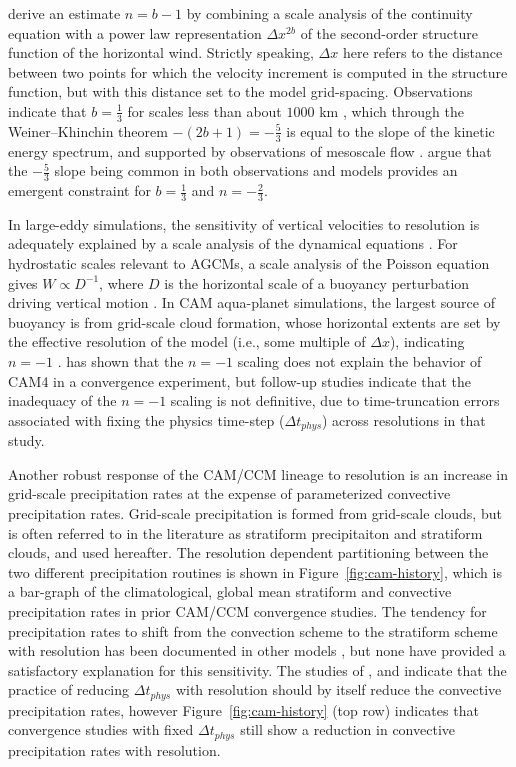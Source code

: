\documentclass[times]{qjrms4}
\begin{document}
\cite{RETAL2016CD} derive an estimate $n= b-1$ by combining a scale analysis of the continuity equation with a power law representation $\Delta x^{2b}$ of the second-order structure function of the horizontal wind. Strictly speaking, $\Delta x$ here refers to the distance between two points for which the velocity increment is computed in the structure function, but with this distance set to the model grid-spacing. Observations indicate that $b=\frac{1}{3}$ for scales less than about $1000$ km \citep{CETAL1999JGR}, which through the Weiner–Khinchin theorem $- \left( 2b+1 \right) = -\frac{5}{3}$ is equal to the slope of the kinetic energy spectrum, and supported by observations of mesoscale flow \citep{NG1985JAS}. \cite{RETAL2016CD} argue that the $-\frac{5}{3}$ slope being common in both observations and models provides an emergent constraint for $b=\frac{1}{3}$ and $n= -\frac{2}{3}$.

In large-eddy simulations, the sensitivity of vertical velocities to resolution is adequately explained by a scale analysis of the dynamical equations \citep{WETAL1997MWR,PG2006JAS,JR2016QJRMS}. For hydrostatic scales relevant to AGCMs, a scale analysis of the Poisson equation gives $W \propto D^{-1}$, where $D$ is the horizontal scale of a buoyancy perturbation driving vertical motion \citep{HR2018JAMES}. In CAM aqua-planet simulations, the largest source of buoyancy is from grid-scale cloud formation, whose horizontal extents are set by the effective resolution of the model (i.e., some multiple of $\Delta x$), indicating $n=-1$ \citep{HR2018JAMES}. \cite{HR2017JCLIM} has shown that the $n=-1$ scaling does not explain the behavior of CAM4 in a convergence experiment, but follow-up studies \citep{HR2018JAMES,HETAL2019JAMES} indicate that the inadequacy of the $n=-1$ scaling is not definitive, due to time-truncation errors associated with fixing the physics time-step ($\Delta t_{phys}$) across resolutions in that study.

Another robust response of the CAM/CCM lineage to resolution is an increase in grid-scale precipitation rates at the expense of parameterized convective precipitation rates. Grid-scale precipitation is formed from grid-scale clouds, but is often referred to in the literature as stratiform precipitaiton and stratiform clouds, and used hereafter. The resolution dependent partitioning between the two different precipitation routines is shown in Figure~\ref{fig:cam-history}, which is a bar-graph of the climatological, global mean stratiform and convective precipitation rates in prior CAM/CCM convergence studies. The tendency for precipitation rates to shift from the convection scheme to the stratiform scheme with resolution has been documented in other models \citep{PS2002CD,RETAL2016CD,TETAL2018CD}, but none have provided a satisfactory explanation for this sensitivity. The studies of \cite{KW1991JGR}, \cite{WETAL1995CD} and \cite{W2013QJRMS} indicate that the practice of reducing $\Delta t_{phys}$ with resolution should by itself reduce the convective precipitation rates, however Figure~\ref{fig:cam-history} (top row) indicates that convergence studies with fixed $\Delta t_{phys}$ still show a reduction in convective precipitation rates with resolution.
\end{document}
